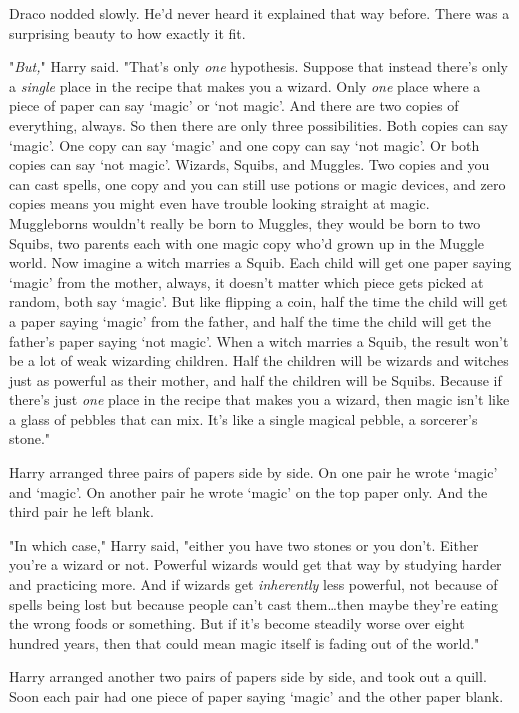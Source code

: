Draco nodded slowly. He'd never heard it explained that way before. There was a
surprising beauty to how exactly it fit.

"\emph{But,}" Harry said. "That's only \emph{one} hypothesis. Suppose that
instead there's only a \emph{single} place in the recipe that makes you a
wizard. Only \emph{one} place where a piece of paper can say `magic' or `not
magic'. And there are two copies of everything, always. So then there are only
three possibilities. Both copies can say `magic'. One copy can say `magic' and
one copy can say `not magic'. Or both copies can say `not magic'. Wizards,
Squibs, and Muggles. Two copies and you can cast spells, one copy and you can
still use potions or magic devices, and zero copies means you might even have
trouble looking straight at magic. Muggleborns wouldn't really be born to
Muggles, they would be born to two Squibs, two parents each with one magic copy
who'd grown up in the Muggle world. Now imagine a witch marries a Squib. Each
child will get one paper saying `magic' from the mother, always, it doesn't
matter which piece gets picked at random, both say `magic'. But like flipping a
coin, half the time the child will get a paper saying `magic' from the father,
and half the time the child will get the father's paper saying `not magic'.
When a witch marries a Squib, the result won't be a lot of weak wizarding
children. Half the children will be wizards and witches just as powerful as
their mother, and half the children will be Squibs. Because if there's just
\emph{one} place in the recipe that makes you a wizard, then magic isn't like a
glass of pebbles that can mix. It's like a single magical pebble, a sorcerer's
stone."

Harry arranged three pairs of papers side by side. On one pair he wrote `magic'
and `magic'. On another pair he wrote `magic' on the top paper only. And the
third pair he left blank.

"In which case," Harry said, "either you have two stones or you don't. Either
you're a wizard or not. Powerful wizards would get that way by studying harder
and practicing more. And if wizards get \emph{inherently} less powerful, not
because of spells being lost but because people can't cast them…then
maybe they're eating the wrong foods or something. But if it's become steadily
worse over eight hundred years, then that could mean magic itself is fading out
of the world."

Harry arranged another two pairs of papers side by side, and took out a quill.
Soon each pair had one piece of paper saying `magic' and the other paper blank.

